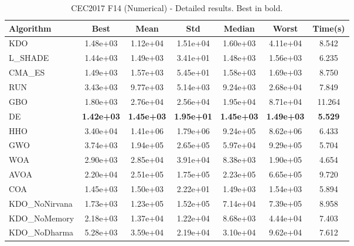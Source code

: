 \begin{table}[H]
\centering\small
\caption{CEC2017 F14 (Numerical) - Detailed results. Best in bold.}
\label{tab:cec2017_F14}
\begin{tabular}{lcccccc}
\toprule
\textbf{Algorithm} & \textbf{Best} & \textbf{Mean} & \textbf{Std} & \textbf{Median} & \textbf{Worst} & \textbf{Time(s)} \\
\midrule
KDO & 1.48e+03 & 1.12e+04 & 1.51e+04 & 1.60e+03 & 4.11e+04 & 8.542 \\
L_SHADE & 1.44e+03 & 1.49e+03 & 3.41e+01 & 1.48e+03 & 1.56e+03 & 6.235 \\
CMA_ES & 1.49e+03 & 1.57e+03 & 5.45e+01 & 1.58e+03 & 1.69e+03 & 8.750 \\
RUN & 3.43e+03 & 9.77e+03 & 5.14e+03 & 9.24e+03 & 2.68e+04 & 7.849 \\
GBO & 1.80e+03 & 2.76e+04 & 2.56e+04 & 1.95e+04 & 8.71e+04 & 11.264 \\
DE & \textbf{1.42e+03} & \textbf{1.45e+03} & \textbf{1.95e+01} & \textbf{1.45e+03} & \textbf{1.49e+03} & \textbf{5.529} \\
HHO & 3.40e+04 & 1.41e+06 & 1.79e+06 & 9.24e+05 & 8.62e+06 & 6.433 \\
GWO & 3.74e+03 & 1.94e+05 & 2.65e+05 & 5.97e+04 & 9.29e+05 & 5.704 \\
WOA & 2.90e+03 & 2.85e+04 & 3.91e+04 & 8.38e+03 & 1.90e+05 & 4.654 \\
AVOA & 2.20e+04 & 2.51e+05 & 1.75e+05 & 2.23e+05 & 6.65e+05 & 9.720 \\
COA & 1.45e+03 & 1.50e+03 & 2.22e+01 & 1.49e+03 & 1.54e+03 & 5.894 \\
KDO_NoNirvana & 1.73e+03 & 1.23e+05 & 1.52e+05 & 7.14e+04 & 7.39e+05 & 8.958 \\
KDO_NoMemory & 2.18e+03 & 1.37e+04 & 1.22e+04 & 8.68e+03 & 4.44e+04 & 7.403 \\
KDO_NoDharma & 5.28e+03 & 3.59e+04 & 2.19e+04 & 3.10e+04 & 9.62e+04 & 7.612 \\
\bottomrule
\end{tabular}
\end{table}
